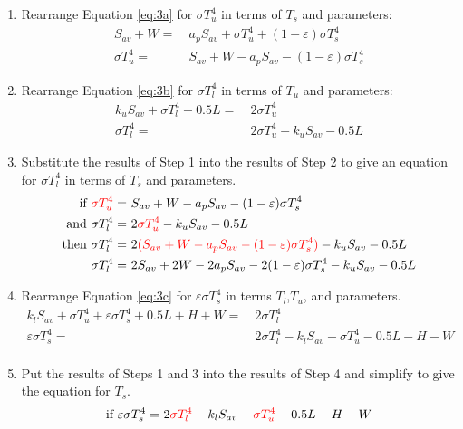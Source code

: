 \documentclass[11pt]{article}
\begin{document}
\begin{enumerate}
\item{Rearrange Equation \ref{eq:3a} for $\sigma T_{u}^{4}$ in terms of $T_{s}$ and parameters:
\begin{align*}
	S_{av} + W =&\ a_{p}S_{av} + \sigma T_{u}^{4} + (1 - \varepsilon)\sigma T_{s}^{4} \\
	\sigma T_{u}^{4} =&\ S_{av} + W - a_{p}S_{av} - (1 - \varepsilon)\sigma T_{s}^{4} 
\end{align*}}
\item{Rearrange Equation \ref{eq:3b} for $\sigma T_{l}^{4}$ in terms of $T_{u}$ and parameters:
\begin{align*}
	k_{u}S_{av} + \sigma T_{l}^{4} + 0.5L =&\ 2\sigma T_{u}^{4}\\
	\sigma T_{l}^{4} =&\ 2\sigma T_{u}^{4} - k_{u}S_{av} - 0.5L
\end{align*}}
\item{Substitute the results of Step 1 into the results of Step 2 to give an equation for $\sigma T_{l}^{4}$ in terms of $T_{s}$ and parameters. 
\begin{align*}
	\text{if }\textcolor{red}{\sigma T_{u}^{4}} =&\ S_{av} + W - a_{p}S_{av} - (1 - \varepsilon)\sigma T_{s}^{4} \\
	\text{and } \sigma T_{l}^{4} =&\ 2\textcolor{red}{\sigma T_{u}^{4}} - k_{u}S_{av} - 0.5L\\
	\text{then } \sigma T_{l}^{4} =&\ 2\textcolor{red}{(S_{av} + W - a_{p}S_{av} - (1 - \varepsilon)\sigma T_{s}^{4})} - k_{u}S_{av} - 0.5L \\
	\sigma T_{l}^{4} =&\ 2S_{av} + 2W - 2a_{p}S_{av} - 2(1 - \varepsilon)\sigma T_{s}^{4} - k_{u}S_{av} - 0.5L 
\end{align*}
}
\item{Rearrange Equation \ref{eq:3c} for $\varepsilon\sigma T_{s}^{4}$ in terms $T_{l}$,$T_{u }$, and parameters.
\begin{align*}
	k_{l}S_{av} + \sigma T_{u}^{4} + \varepsilon \sigma T_{s}^{4} + 0.5L + H + W =&\ 2\sigma T_{l}^{4} \\
	\varepsilon \sigma T_{s}^{4} =&\ 2\sigma T_{l}^{4} - k_{l}S_{av} - \sigma T_{u}^{4} - 0.5L - H - W \\
\end{align*}
}
\item{Put the results of Steps 1 and 3 into the results of Step 4 and simplify to give the equation for $T_{s}$.}
\footnotesize
\begin{align*}
	\text{if } \varepsilon\sigma T_{s}^{4} =&\ 2\textcolor{red}{\sigma T_{l}^{4}} - k_{l}S_{av} - \textcolor{red}{\sigma T_{u}^{4}} - 0.5L - H - W \\

\end{align*}
\end{enumerate}
\end{document}
